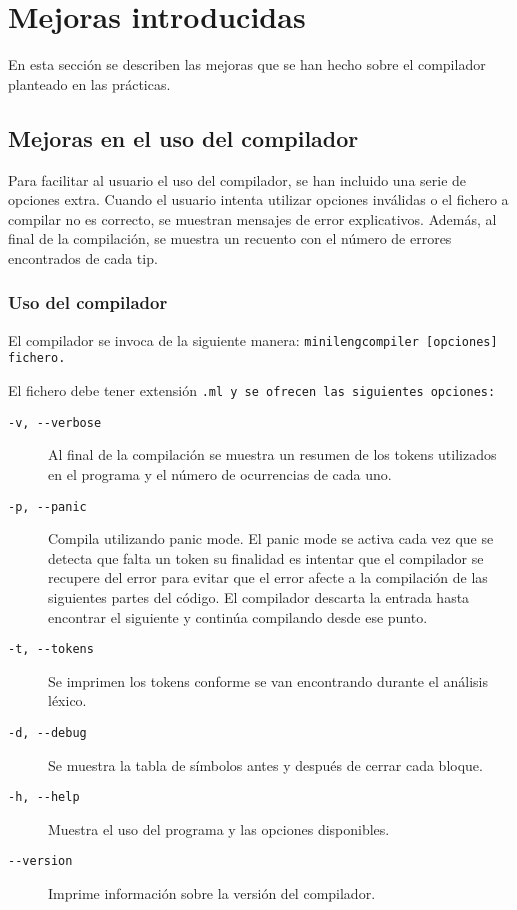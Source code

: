 \section{Mejoras introducidas}
En esta sección se describen las mejoras que se han hecho sobre el compilador planteado en las prácticas.

\subsection{Mejoras en el uso del compilador}
Para facilitar al usuario el uso del compilador, se han incluido una serie de opciones extra. Cuando el usuario intenta utilizar opciones inválidas o el fichero a compilar no es correcto, se muestran mensajes de error explicativos. Además, al final de la compilación, se muestra un recuento con el número de errores encontrados de cada tip.

\subsubsection{Uso del compilador}
El compilador se invoca de la siguiente manera: \tt{minilengcompiler [opciones] fichero}.

El fichero debe tener extensión \tt{.ml} y se ofrecen las siguientes opciones:

\begin{description}
     \item[\tt{-v, -{}-verbose}] Al final de la compilación se muestra un resumen de los tokens utilizados en el programa y el número de ocurrencias de cada uno.
     \item[\tt{-p, -{}-panic}] Compila utilizando panic mode. El panic mode se activa cada vez que se detecta que falta un token \car{;} su finalidad es intentar que el compilador se recupere del error para evitar que el error afecte a la compilación de las siguientes partes del código. El compilador descarta la entrada hasta encontrar el siguiente \car{;} y continúa compilando desde ese punto.
     \item[\tt{-t, -{}-tokens}] Se imprimen los tokens conforme se van encontrando durante el análisis léxico.
     \item[\tt{-d, -{}-debug}] Se muestra la tabla de símbolos antes y después de cerrar cada bloque.
     \item[\tt{-h, -{}-help}] Muestra el uso del programa y las opciones disponibles.
     \item[\tt{-{}-version}] Imprime información sobre la versión del compilador.
\end{description}

